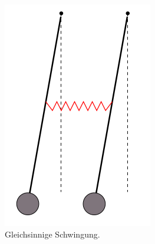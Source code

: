 \begin{figure}[H]
	\centering
	\begin{subfigure}[b]{0.3\textwidth}
		\centering
		\includegraphics[width=\textwidth]{images/gleichsinnig.png}
		\caption{Gleichsinnige Schwingung.}
		\label{fig:gleichsinnig}
	\end{subfigure}
	\hfill
	\begin{subfigure}[b]{0.3\textwidth}
		\centering

\end{subfigure}
\end{figure}
